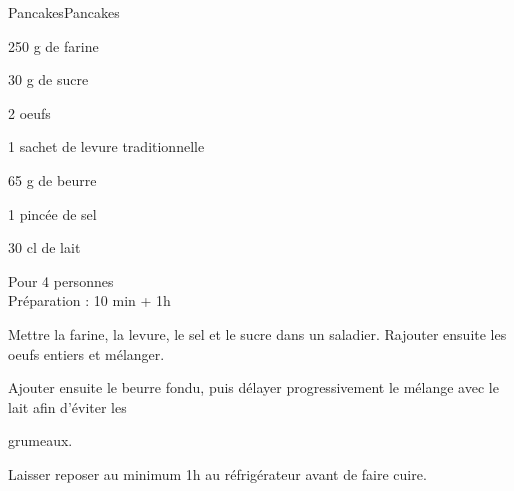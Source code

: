\begin{recette}{Pancakes}{Pancakes}

\begin{ingredients}
250 g de farine\par
30 g de sucre\par
2 oeufs\par
1 sachet de levure traditionnelle\par
65 g de beurre\par
1 pincée de sel\par
30 cl de lait\par
\end{ingredients}

\begin{infos}
Pour 4 personnes\\
Préparation : 10 min + 1h\\
\end{infos}

\begin{etapes}
\item Mettre la farine, la levure, le sel et le sucre dans un saladier. Rajouter ensuite les oeufs entiers et mélanger.
\item Ajouter ensuite le beurre fondu, puis délayer progressivement le mélange avec le lait afin d'éviter les
\item grumeaux.
\item Laisser reposer au minimum 1h au réfrigérateur avant de faire cuire.
\end{etapes}

\end{recette}